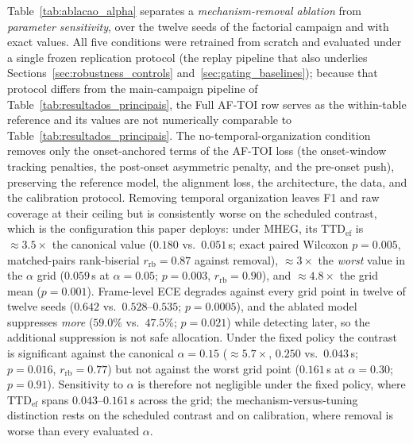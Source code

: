 \documentclass[a4paper,fleqn]{cas-dc}
\newcommand{\MHEG}{\mbox{MHEG}\xspace}
\begin{document}
{\color{\revcolor}Table~\ref{tab:ablacao_alpha} separates a
\emph{mechanism-removal ablation} from \emph{parameter sensitivity}, over the
twelve seeds of the factorial campaign and with exact values. All five
conditions were retrained from scratch and evaluated under a single frozen
replication protocol (the replay pipeline that also underlies
Sections~\ref{sec:robustness_controls} and~\ref{sec:gating_baselines}); because that
protocol differs from the main-campaign pipeline of
Table~\ref{tab:resultados_principais}, the Full \mbox{AF-TOI} row serves as
the within-table reference and its values are not numerically comparable to
Table~\ref{tab:resultados_principais}. The
no-temporal-organization condition removes only the onset-anchored terms of
the \mbox{AF-TOI} loss (the onset-window tracking penalties, the post-onset
asymmetric penalty, and the pre-onset push), preserving the reference model,
the alignment loss, the architecture, the data, and the calibration protocol.
Removing temporal organization leaves F1 and raw coverage at their ceiling
but is consistently worse on the scheduled contrast, which is the
configuration this paper deploys: under \MHEG, its
$\mathrm{TTD}_{\mathrm{ef}}$ is ${\approx}3.5\times$ the canonical value
($0.180$ vs.\ $0.051$\,s; exact paired Wilcoxon $p=0.005$, matched-pairs
rank-biserial $r_{\mathrm{rb}}=0.87$ against removal), ${\approx}3\times$
the \emph{worst} value in the $\alpha$
grid ($0.059$\,s at $\alpha=0.05$; $p=0.003$, $r_{\mathrm{rb}}=0.90$), and
${\approx}4.8\times$ the grid mean ($p=0.001$). Frame-level ECE degrades
against every grid point in twelve of twelve seeds ($0.642$ vs.\
$0.528$--$0.535$; $p=0.0005$), and the ablated model suppresses \emph{more}
($59.0\%$ vs.\ $47.5\%$; $p=0.021$) while detecting later, so the additional
suppression is not safe allocation. Under the fixed policy the contrast is
significant against the canonical $\alpha=0.15$ (${\approx}5.7\times$,
$0.250$ vs.\ $0.043$\,s; $p=0.016$, $r_{\mathrm{rb}}=0.77$) but not against the worst
grid point ($0.161$\,s at $\alpha=0.30$; $p=0.91$). Sensitivity to $\alpha$
is therefore not negligible under the fixed policy, where
$\mathrm{TTD}_{\mathrm{ef}}$ spans $0.043$--$0.161$\,s across the grid; the
mechanism-versus-tuning distinction rests on the scheduled contrast and on
calibration, where removal is worse than every evaluated $\alpha$.}
\end{document}
